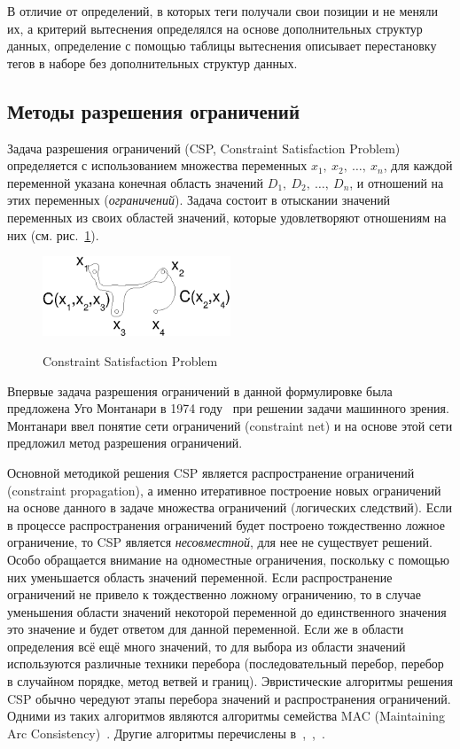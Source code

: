В отличие от определений, в которых теги получали свои позиции и не
меняли их, а критерий вытеснения определялся на основе
дополнительных структур данных, определение с помощью таблицы
вытеснения описывает перестановку тегов в наборе без дополнительных
структур данных.

\subsection{Методы разрешения ограничений}

Задача разрешения ограничений (CSP, Constraint Satisfaction
Problem)~\cite{CSP} определяется с использованием множества
переменных $x_1,~x_2,~\dots,~x_n$, для каждой переменной указана
конечная область значений $D_1,~D_2,~\dots,~D_n$, и отношений на
этих переменных (\emph{ограничений}). Задача состоит в отыскании
значений переменных из своих областей значений, которые
удовлетворяют отношениям на них (см. рис.~\ref{csp}).

\begin{figure}[h] \center
  \includegraphics[width=0.5\textwidth]{2.theor/csp}\\
  \caption{Constraint Satisfaction Problem}\label{csp}
\end{figure}

Впервые задача разрешения ограничений в данной формулировке была
предложена Уго Монтанари в 1974 году~\cite{montanari} при решении
задачи машинного зрения. Монтанари ввел понятие сети ограничений
(constraint net) и на основе этой сети предложил метод разрешения
ограничений.

Основной методикой решения CSP является распространение ограничений
(constraint propagation), а именно итеративное построение новых
ограничений на основе данного в задаче множества ограничений
(логических следствий). Если в процессе распространения ограничений
будет построено тождественно ложное ограничение, то CSP является
\emph{несовместной}, для нее не существует решений. Особо обращается
внимание на одноместные ограничения, поскольку с помощью них
уменьшается область значений переменной. Если распространение
ограничений не привело к тождественно ложному ограничению, то в
случае уменьшения области значений некоторой переменной до
единственного значения это значение и будет ответом для данной
переменной. Если же в области определения всё ещё много значений, то
для выбора из области значений используются различные техники
перебора (последовательный перебор, перебор в случайном порядке,
метод ветвей и границ). Эвристические алгоритмы решения CSP обычно
чередуют этапы перебора значений и распространения ограничений.
Одними из таких алгоритмов являются алгоритмы семейства MAC
(Maintaining Arc Consistency)~\cite{CSP}. Другие алгоритмы
перечислены в~\cite{CSPS1},~\cite{CSPS2},~\cite{CSPS3}.

